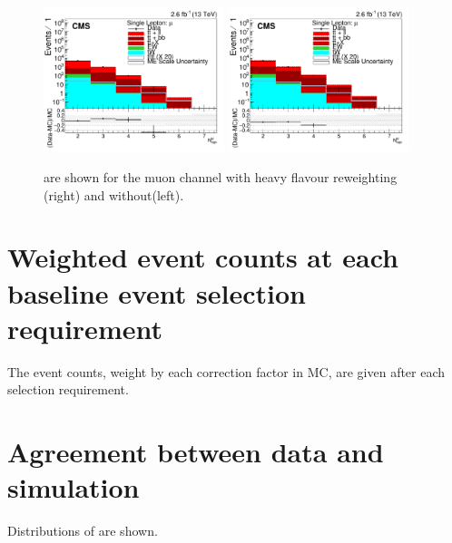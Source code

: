 \begin{figure}[ht!]
    \includegraphics[width=0.47\textwidth]{images/Run2/nMtags_StackLogY_HF_wo_reweight.pdf} 
    \includegraphics[width=0.47\textwidth]{images/Run2/nMtags_StackLogY_HF_w_reweight.pdf} 
    \caption{\nMtags are shown for the muon channel with heavy flavour reweighting (right) and without(left).}
    \label{fig:HF_reweight}
\end{figure}

\clearpage

\section{Weighted event counts at each baseline event selection requirement \label{cutflow13}}

The event counts, weight by each correction factor in MC, are given after each selection requirement.

\section{Agreement between data and simulation}
Distributions of  are shown.

